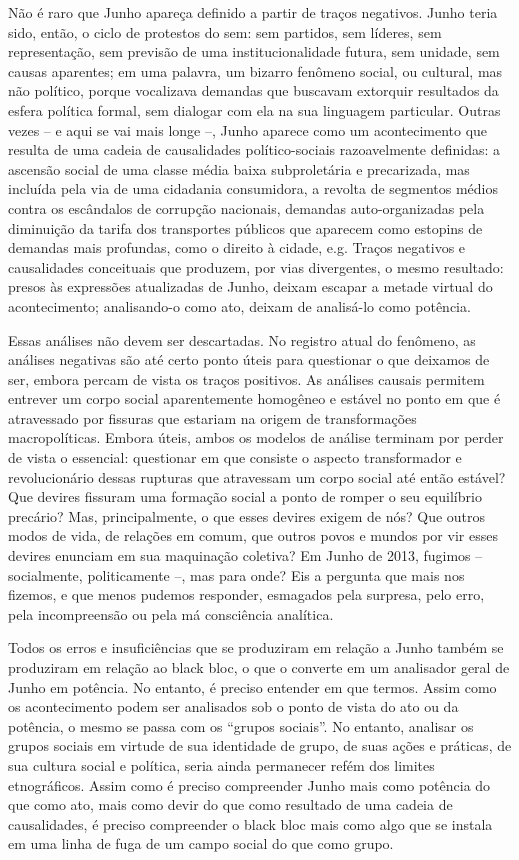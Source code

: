 Não é raro que Junho apareça definido a partir de traços negativos.
Junho teria sido, então, o ciclo de protestos do sem: sem partidos, sem
líderes, sem representação, sem previsão de uma institucionalidade
futura, sem unidade, sem causas aparentes; em uma palavra, um bizarro
fenômeno social, ou cultural, mas não político, porque vocalizava
demandas que buscavam extorquir resultados da esfera política formal,
sem dialogar com ela na sua linguagem particular. Outras vezes -- e aqui
se vai mais longe --, Junho aparece como um acontecimento que resulta de
uma cadeia de causalidades político-sociais razoavelmente definidas: a
ascensão social de uma classe média baixa subproletária e precarizada,
mas incluída pela via de uma cidadania consumidora, a revolta de
segmentos médios contra os escândalos de corrupção nacionais, demandas
auto-organizadas pela diminuição da tarifa dos transportes públicos que
aparecem como estopins de demandas mais profundas, como o direito à
cidade, e.g. Traços negativos e causalidades conceituais que produzem,
por vias divergentes, o mesmo resultado: presos às expressões
atualizadas de Junho, deixam escapar a metade virtual do acontecimento;
analisando-o como ato, deixam de analisá-lo como potência.

Essas análises não devem ser descartadas. No registro atual do fenômeno,
as análises negativas são até certo ponto úteis para questionar o que
deixamos de ser, embora percam de vista os traços positivos. As análises
causais permitem entrever um corpo social aparentemente homogêneo e
estável no ponto em que é atravessado por fissuras que estariam na
origem de transformações macropolíticas. Embora úteis, ambos os modelos
de análise terminam por perder de vista o essencial: questionar em que
consiste o aspecto transformador e revolucionário dessas rupturas que
atravessam um corpo social até então estável? Que devires fissuram uma
formação social a ponto de romper o seu equilíbrio precário? Mas,
principalmente, o que esses devires exigem de nós? Que outros modos de
vida, de relações em comum, que outros povos e mundos por vir esses
devires enunciam em sua maquinação coletiva? Em Junho de 2013, fugimos
-- socialmente, politicamente --, mas para onde? Eis a pergunta que mais
nos fizemos, e que menos pudemos responder, esmagados pela surpresa,
pelo erro, pela incompreensão ou pela má consciência analítica.

Todos os erros e insuficiências que se produziram em relação a Junho
também se produziram em relação ao black bloc, o que o converte em um
analisador geral de Junho em potência. No entanto, é preciso entender em
que termos. Assim como os acontecimento podem ser analisados sob o ponto
de vista do ato ou da potência, o mesmo se passa com os ``grupos
sociais''. No entanto, analisar os grupos sociais em virtude de sua
identidade de grupo, de suas ações e práticas, de sua cultura social e
política, seria ainda permanecer refém dos limites etnográficos. Assim
como é preciso compreender Junho mais como potência do que como ato,
mais como devir do que como resultado de uma cadeia de causalidades, é
preciso compreender o black bloc mais como algo que se instala em uma
linha de fuga de um campo social do que como grupo.

